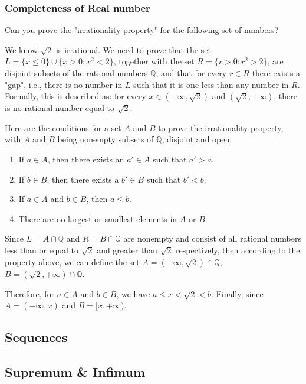 \documentclass{article}
\begin{document}
\subsubsection{Completeness of Real number}

Can you prove the "irrationality property" for the following set of numbers?

We know $\sqrt{2}$ is irrational. We need to prove that the set 
$L = \{ x \leq 0 \} \cup \{ x > 0 : x^2 < 2 \}$, 
together with the set $R = \{ r > 0 : r^2 > 2 \}$, 
are disjoint subsets of the rational numbers $\mathbb{Q}$, 
and that for every $r \in R$ there exists a "gap", 
i.e., there is no number in $L$ such that it is one less than any number in $R$. 
Formally, this is described as: for every $x \in (-\infty, \sqrt{2})$ 
and $(\sqrt{2}, +\infty)$, there is no rational number equal to $\sqrt{2}$.

Here are the conditions for a set $A$ and $B$ to prove the irrationality property, 
with $A$ and $B$ being nonempty subsets of $\mathbb{Q}$, disjoint and open:

\begin{enumerate}
  \item If $a \in A$, then there exists an $a' \in A$ such that $a' > a$.
  \item If $b \in B$, then there exists a $b' \in B$ such that $b' < b$.
  \item If $a \in A$ and $b \in B$, then $a \leq b$.
  \item There are no largest or smallest elements in $A$ or $B$.
\end{enumerate}

Since $L = A \cap \mathbb{Q}$ and $R = B \cap \mathbb{Q}$ are nonempty and consist of all rational numbers less than or equal to $\sqrt{2}$ and greater than $\sqrt{2}$ respectively, then according to the property above, we can define the set $A = (-\infty, \sqrt{2}) \cap \mathbb{Q}$, $B = (\sqrt{2}, +\infty) \cap \mathbb{Q}$.

Therefore, for $a \in A$ and $b \in B$, we have $a \leq x < \sqrt{2} < b$. Finally, since $A = (-\infty, x)$ and $B = [x, +\infty)$.







\subsection{Sequences}
\subsection{Supremum \& Infimum}
\end{document}
